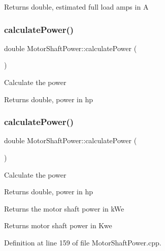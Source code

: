 \begin{DoxyReturn}{Returns}
double, estimated full load amps in A 
\end{DoxyReturn}
\mbox{\label{class_motor_shaft_power_a4a2756922b290bec13550110aac25b8c}} 
\subsubsection{\texorpdfstring{calculate\+Power()}{calculatePower()}\hspace{0.1cm}{\footnotesize\ttfamily [1/3]}}
{\footnotesize\ttfamily double Motor\+Shaft\+Power\+::calculate\+Power (\begin{DoxyParamCaption}{ }\end{DoxyParamCaption})}

Calculate the power

\begin{DoxyReturn}{Returns}
double, power in hp 
\end{DoxyReturn}
\mbox{\label{class_motor_shaft_power_a4a2756922b290bec13550110aac25b8c}} 
\subsubsection{\texorpdfstring{calculate\+Power()}{calculatePower()}\hspace{0.1cm}{\footnotesize\ttfamily [2/3]}}
{\footnotesize\ttfamily double Motor\+Shaft\+Power\+::calculate\+Power (\begin{DoxyParamCaption}{ }\end{DoxyParamCaption})}

Calculate the power

\begin{DoxyReturn}{Returns}
double, power in hp
\end{DoxyReturn}
Returns the motor shaft power in k\+We \begin{DoxyReturn}{Returns}
motor shaft power in Kwe 
\end{DoxyReturn}


Definition at line 159 of file Motor\+Shaft\+Power.\+cpp.

